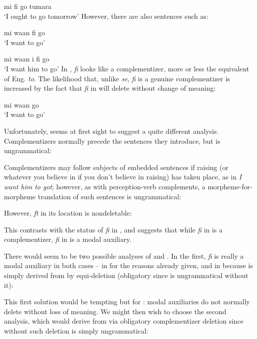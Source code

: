 \ea\label{ex:2:187}
mi fi go tumara\\
\glt `I ought to go tomorrow'
\z
However, there are also sentences such as:

\ea\label{ex:2:188}
mi waan fi go\\
\glt `I want to go'
\z

\ea\label{ex:2:189}
 mi waan i fi go\\
\glt `I want him to go'
\z
In , \textit{fi} looks like a complementizer, more or less the equivalent of Eng. \textit{to}. The likelihood that, unlike \textit{se}, \textit{fi} is a genuine complementizer is increased by the fact that \textit{fi} in  will delete without change of meaning:

\ea\label{ex:2:190}
 mi waan go \\
\glt `I want to go'
\z

Unfortunately,  seems at first sight to suggest a quite different analysis. Complementizers normally precede the sentences they introduce, but  is ungrammatical:

\z

Complementizers may follow subjects of embedded sentences if raising (or whatever you believe in if you don't believe in raising) has taken place, as in \textit{I want him to got}; however, as with perception-verb complements, a morpheme-for-morpheme translation of such sentences is ungrammatical:

\glt
\z

However, \textit{ft} in its  location is nondeletable:

\z
This contrasts with the status of \textit{fi} in , and suggests that while
\textit{fi} in  is a complementizer, \textit{fi} in  is a modal auxiliary.

There would seem to be two possible analyses of  and . In the first, \textit{fi} is really a modal auxiliary in both cases -- in  for the reasons already given, and in  because  is simply derived from  by equi-deletion (obligatory since  is ungrammatical without it):

\z

This first solution would be tempting but for : modal auxiliaries do not normally delete without loss of meaning. We might then wish to choose the second analysis, which would derive  from  via obligatory complementizer deletion since without such deletion  is simply ungrammatical:


